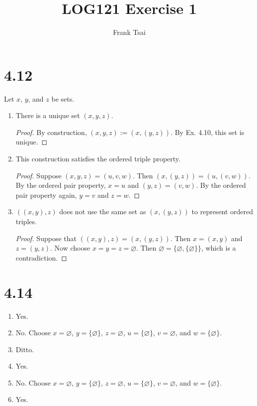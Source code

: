 \documentclass[a4paper]{article}
\title{LOG121 Exercise 1}
\author{Frank Tsai}
\begin{document}
\maketitle

\section{4.12}
Let $x$, $y$, and $z$ be sets.
\begin{enumerate}
\item There is a unique set $(x,y,z)$.
  \begin{proof}
    By construction, $(x,y,z) := (x,(y,z))$.
    By Ex. 4.10, this set is unique. \qedhere
  \end{proof}
\item This construction satisfies the ordered triple property.
  \begin{proof}
    Suppose $(x,y,z) = (u,v,w)$.
    Then $(x,(y,z)) = (u,(v,w))$.
    By the ordered pair property, $x = u$ and $(y,z) = (v,w)$.
    By the ordered pair property again, $y = v$ and $z = w$.
  \end{proof}
\item $((x,y),z)$ does not use the same set as $(x,(y,z))$ to represent ordered triples.
  \begin{proof}
    Suppose that $((x,y),z) = (x,(y,z))$.
    Then $x = (x,y)$ and $z = (y,z)$.
    Now choose $x = y = z = \varnothing$.
    Then $\varnothing = \{\varnothing,\{\varnothing\}\}$, which is a contradiction.
  \end{proof}
\end{enumerate}

\section{4.14}
\begin{enumerate}
\item Yes.
\item No. Choose $x = \varnothing$, $y = \{\varnothing\}$, $z = \varnothing$, $u = \{\varnothing\}$, $v = \varnothing$, and $w = \{\varnothing\}$.
\item Ditto.
\item Yes.
\item No. Choose $x = \varnothing$, $y = \{\varnothing\}$, $z = \varnothing$, $u = \{\varnothing\}$, $v = \varnothing$, and $w = \{\varnothing\}$.
\item Yes.
\end{enumerate}

\end{document}
